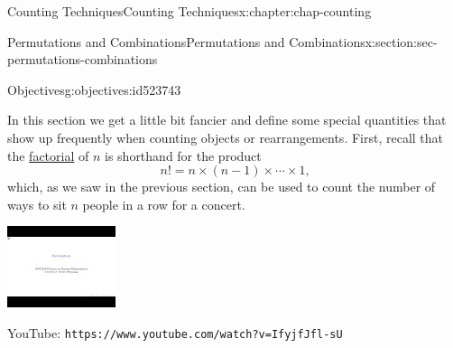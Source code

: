 \documentclass[oneside,10pt,]{book}
\newcommand{\mono}[1]{\texttt{#1}}
\numberwithin{equation}{section}
\newlength{\qrsize}
\newlength{\previewwidth}
\begin{document}
\begin{chapterptx}{Counting Techniques}{}{Counting Techniques}{}{}{x:chapter:chap-counting}
\begin{sectionptx}{Permutations and Combinations}{}{Permutations and Combinations}{}{}{x:section:sec-permutations-combinations}
\begin{objectives}{Objectives}{g:objectives:id523743}
\begin{itemize}[label=\textbullet]
\end{itemize}
\end{objectives}
In this section we get a little bit fancier and define some special quantities that show up frequently when counting objects or rearrangements. First, recall that the \hyperref[x:definition:def-factorial]{factorial} of \(n\) is shorthand for the product%
\begin{equation*}
n! = n \times (n-1) \times \cdots \times 1\text{,}
\end{equation*}
which, as we saw in the previous section, can be used to count the number of ways to sit \(n\) people in a row for a concert.%
\begin{sidebyside}{1}{0}{0}{0}%
\begin{sbspanel}{1}%
\setlength{\qrsize}{9em}
\setlength{\previewwidth}{\linewidth}
\addtolength{\previewwidth}{-\qrsize}
\begin{tcbraster}[raster columns=2, raster column skip=1pt, raster halign=center, raster force size=false, raster left skip=0pt, raster right skip=0pt]%
\begin{tcolorbox}[previewstyle, width=\previewwidth]%
\includegraphics[width=0.80\linewidth,height=\qrsize,keepaspectratio]{images/video-permutation.jpg}%
\end{tcolorbox}%
\begin{tcolorbox}[qrstyle]%
{\hypersetup{urlcolor=black}}%
\end{tcolorbox}%
\begin{tcolorbox}[captionstyle]%
\small YouTube: \mono{https://www.youtube.com/watch?v=IfyjfJfl-sU}\end{tcolorbox}%
\end{tcbraster}%
\end{sbspanel}%

\end{sidebyside}
\end{sectionptx}
\end{chapterptx}
\end{document}
